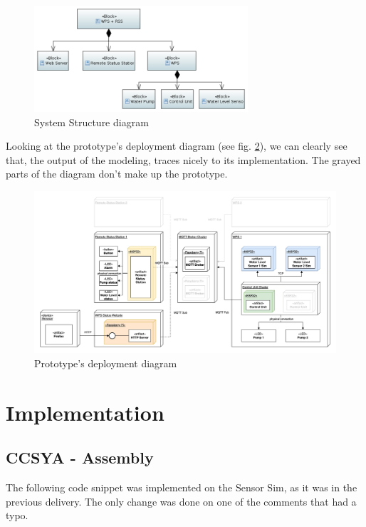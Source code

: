 \documentclass[11pt]{article}
\begin{document}
\begin{figure}[H]
  \centering
  \includegraphics[width=300px]{../diagrams/system-structure.png}
  \caption{System Structure diagram}
  \label{fig:System Structure Diagram}
\end{figure}

Looking at the prototype's deployment diagram (see fig. \ref{fig:deployment-diagram}), we can clearly see that, the output of the modeling, traces nicely to its implementation.
The grayed parts of the diagram don't make up the prototype. 

\begin{figure}[H]
  \centering
  \includegraphics[width=\linewidth]{../diagrams/deployment-diagram.jpg}
  \caption{Prototype's deployment diagram}
  \label{fig:deployment-diagram}
\end{figure}

\newpage
\section{Implementation}

\subsection{CCSYA - Assembly}

The following code snippet was implemented on the Sensor Sim, as it was in the previous delivery. The only change was done on one of the comments that had a typo.
\end{document}
